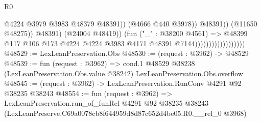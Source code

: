\begin{lexlean}{R0}
\begin{coremodule}
                                                      @4224
                                                      @3979
                                                      @3983
                                                      @48379
                                                      @48391))
                                                  (@4666 @440 @3978))
                                                @48391))
                                            (@11650 @48275))
                                          @48391)
                                        (@24004 @48419))
                                      (fun ("_" : @38200 @4561) =>
                                      @48399
                                        @117
                                        @106
                                        @173
                                        @4224
                                        @4224
                                        @3983
                                        @4171
                                        @48391
                                        @7144))))))))))))))))))
@48529 := LexLeanPreservation.Obs
@48530 := (request : @3962) -> @48529
@48539 := fun (request : @3962) =>
  cond.{1} @48529 @38238 (LexLeanPreservation.Obs.value @38242) LexLeanPreservation.Obs.overflow
@48545 := (request : @3962) -> LexLeanPreservation.RunConv @4291 @92 @38235 @38243
@48554 := fun (request : @3962) =>
  LexLeanPreservation.run_of_funRel
    @4291
    @92
    @38235
    @38243
    (LexLeanPreserve.C69a0078cb8f644959d8d87c652d4be05.R0.__rel_0 @3968)
\end{coremodule}
\end{lexlean}
